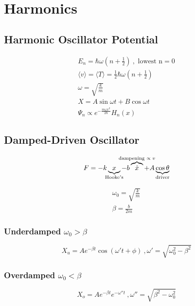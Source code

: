 \documentclass[10pt,a4paper]{article}
\begin{document}

\section{Harmonics}
\subsection{Harmonic Oscillator Potential}
\begin{align}
    E_n = \hbar \omega\left( n + \frac{1}{2} \right) ~,\textrm{ lowest n} =0\\
    \langle v \rangle = \langle T \rangle = \frac{1}{2}\hbar \omega \left( n + \frac{1}{2} \right) \\
    \omega = \sqrt{ \frac{k}{m}}\\
    X = A \sin \omega t + B \cos \omega t\\
    \Psi_n \propto e^{-\frac{m\omega x^2}{2\hbar}}H_n(x)
\end{align}

\subsection{Damped-Driven Oscillator}
\begin{equation}
 F = -k\underbrace{x}_{\mathclap{\textrm{Hooke's}}} -b\overbrace{\dot{x}}^{\mathclap{\textrm{dampening $\propto v$}}} + A\underbrace{\cos \theta}_{\mathclap{\textrm{driver}}}
\end{equation}

\begin{align}
 \omega_0 = \sqrt{\frac{k}{m}}\\
 \beta = \frac{b}{2m}
\end{align}

\subsubsection{Underdamped $\omega_0 > \beta$}
\begin{equation}
  X_u = Ae^{-\beta t} \cos (\omega't + \phi)    ~, \omega' = \sqrt{\omega_0^2 - \beta^2}
\end{equation}

\subsubsection{Overdamped $\omega_0 < \beta$}
\begin{equation}
 X_o = Ae^{-\beta t} e^{-\omega''t}     ~, \omega'' = \sqrt{\beta^2 - \omega_0^2}
\end{equation}
\end{document}
